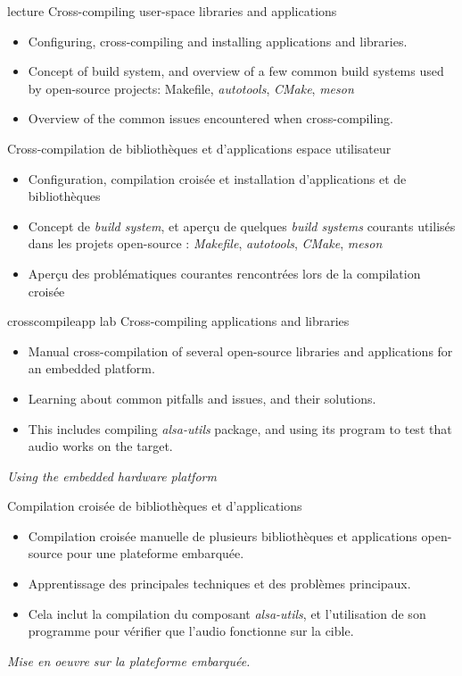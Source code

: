 {lecture}
{Cross-compiling user-space libraries and applications}
{
  \begin{itemize}
  \item Configuring, cross-compiling and installing applications and
    libraries.
  \item Concept of build system, and overview of a few common build
    systems used by open-source projects: Makefile, {\em autotools},
    {\em CMake}, {\em meson}
  \item Overview of the common issues encountered when
    cross-compiling.
  \end{itemize}
}
{Cross-compilation de bibliothèques et d'applications espace utilisateur}
{
  \begin{itemize}
  \item Configuration, compilation croisée et installation
    d'applications et de bibliothèques
  \item Concept de {\em build system}, et aperçu de quelques {\em
      build systems} courants utilisés dans les projets open-source :
    {\em Makefile}, {\em autotools}, {\em CMake}, {\em meson}
  \item Aperçu des problématiques courantes rencontrées lors de la
    compilation croisée
  \end{itemize}
}
{crosscompileapp}
{lab}
{Cross-compiling applications and libraries}
{
  \begin{itemize}
  \item Manual cross-compilation of several open-source libraries and
    applications for an embedded platform.
  \item Learning about common pitfalls and issues, and their
    solutions.
  \item This includes compiling {\em alsa-utils} package,
    and using its  program to test that
    audio works on the target.
  \end{itemize}

  \vspace{0.5cm}
  {\em Using the embedded hardware platform}
}
{Compilation croisée de bibliothèques et d'applications}
{
  \begin{itemize}
  \item Compilation croisée manuelle de plusieurs bibliothèques et
    applications open-source pour une plateforme embarquée.
  \item Apprentissage des principales techniques et des problèmes
    principaux.
  \item Cela inclut la compilation du composant {\em alsa-utils},
     et l'utilisation de son programme  pour
     vérifier que l'audio fonctionne sur la cible.
  \end{itemize}

  \vspace{0.5cm}
  {\em Mise en oeuvre sur la plateforme embarquée.}
}
